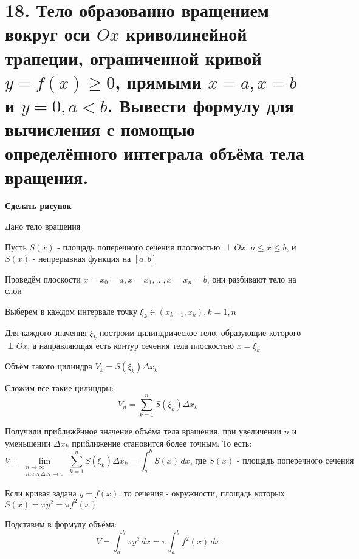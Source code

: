 \documentclass[11pt]{article}
\begin{document}
\section*{18. Тело образованно вращением вокруг оси $Ox$ криволинейной трапеции, ограниченной кривой $y = f(x) \geq 0$, прямыми $x = a, x = b$ и $y = 0, a < b$. Вывести формулу для вычисления с помощью определённого интеграла объёма тела вращения.}
\par\textbf{Сделать рисунок}
\par Дано тело вращения
\par Пусть $S(x)$ - площадь поперечного сечения плоскостью $\perp Ox$, $a \leq x \leq b$, и $S(x)$ - непрерывная функция на $[a, b]$
\par Проведём плоскости $x = x_{0} = a, x = x_{1}, \dots, x = x_{n} = b$, они разбивают тело на слои
\par Выберем в каждом интервале точку $\xi_{k} \in (x_{k - 1}, x_{k}), k = \overline{1, n}$
\par Для каждого значения $\xi_{k}$ построим цилиндрическое тело, образующие которого $\perp Ox$, а направляющая есть контур сечения тела плоскостью $x = \xi_{k}$
\par Объём такого цилиндра $V_{k} = S(\xi_{k}) \Delta x_{k}$
\par Сложим все такие цилиндры:$$V_{n} = \sum_{k = 1}^{n} S(\xi_{k}) \Delta x_{k}$$
\par Получили приближённое значение объёма тела вращения, при увеличении $n$ и уменьшении $\Delta x_{k}$ приближение становится более точным. То есть: $$V = \lim_{ \substack{n \to \infty \\ max_{k} \Delta x_{k} \to 0} } \sum_{k = 1}^{n} S(\xi_{k}) \Delta x_{k} = \int_{a}^{b} S(x) \, dx \text{, где } S(x) \text{ - площадь поперечного сечения}$$
\par Если кривая задана $y = f(x)$, то сечения - окружности, площадь которых $S(x) = \pi y^2 = \pi f^2(x)$
\par Подставим в формулу объёма: $$V = \int_{a}^{b} \pi y^2\, dx = \pi \int_{a}^{b} f^2(x) \, dx$$
\end{document}

